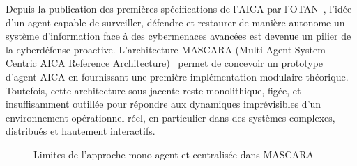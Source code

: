 \documentclass[ twoside,openright,titlepage,numbers=noenddot,headinclude,%
                footinclude=true,cleardoublepage=empty,abstractoff, %
                BCOR=5mm,paper=a4,fontsize=11pt,%
                french,american,%
                ]{scrreprt}
\begin{document}

Depuis la publication des premières spécifications de l'AICA par l'OTAN~\cite{Kott2018}, l'idée d'un agent capable de surveiller, défendre et restaurer de manière autonome un système d'information face à des cybermenaces avancées est devenue un pilier de la cyberdéfense proactive. L'architecture MASCARA (Multi-Agent System Centric AICA Reference Architecture)~\cite{Kott2023} permet de concevoir un prototype d'agent AICA en fournissant une première implémentation modulaire théorique. Toutefois, cette architecture sous-jacente reste monolithique, figée, et insuffisamment outillée pour répondre aux dynamiques imprévisibles d'un environnement opérationnel réel, en particulier dans des systèmes complexes, distribués et hautement interactifs.

\begin{figure}[h]
    \centering
    \caption{Limites de l'approche mono-agent et centralisée dans MASCARA}
    \label{fig:mascara-limit}
\end{figure}
\end{document}
